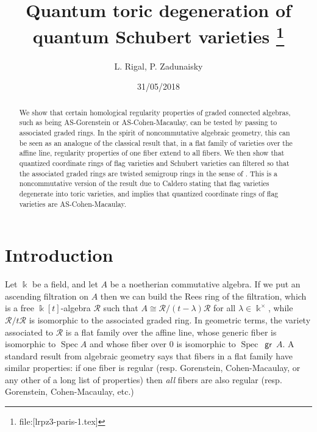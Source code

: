 \documentclass[11pt,fleqn]{article}
\title{
Quantum toric degeneration of quantum Schubert varieties
\footnote{file:[lrpz3-paris-1.tex]}
}
\date{31/05/2018}
\author{L. Rigal, P. Zadunaisky}
\renewcommand\k{\Bbbk}
\DeclareMathOperator\gr{\mathsf{gr}}
\DeclareMathOperator\Spec{Spec}
\begin{document}
\maketitle

\begin{abstract}
We show that certain homological regularity properties of graded connected 
algebras, such as being AS-Gorenstein or AS-Cohen-Macaulay, can be tested by 
passing to associated graded rings. In the spirit of noncommutative algebraic 
geometry, this can be seen as an analogue of the classical result that, in a 
flat family of varieties over the affine line, regularity properties of one 
fiber extend to all fibers. 
We then show that quantized coordinate rings of flag varieties and Schubert 
varieties can filtered so that the associated graded rings are twisted 
semigroup rings in the sense of \cite{RZ}. This is a noncommutative version
of the result due to Caldero \cite{C} stating that flag varieties degenerate
into toric varieties, and implies that quantized coordinate rings of flag
varieties are AS-Cohen-Macaulay.
\end{abstract}


\section{Introduction}
Let $\k$ be a field, and let $A$ be a noetherian commutative algebra. If we put
an ascending filtration on $A$ then we can build the Rees ring of the 
filtration, which is a free $\k[t]$-algebra $\mathcal R$ such that $A \cong 
\mathcal R / (t - \lambda)\mathcal R$ for all $\lambda \in \k^\times$, while
$\mathcal R / t \mathcal R$ is isomorphic to the associated graded ring. In 
geometric terms, the variety associated to $\mathcal R$ is a flat family over
the affine line, whose generic fiber is isomorphic to $\Spec A$ and whose
fiber over $0$ is isomorphic to $\Spec~\gr~A$. A standard result from 
algebraic geometry says that fibers in a flat family have similar properties: 
if one fiber is regular (resp. Gorenstein, Cohen-Macaulay, or any other of 
a long list of properties) then \emph{all} fibers are also regular (resp. 
Gorenstein, Cohen-Macaulay, etc.)
\end{document}
